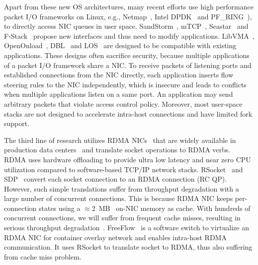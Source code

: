 Apart from these new OS architectures, many recent efforts use high performance packet I/O frameworks on Linux, e.g., Netmap~\cite{rizzo2012netmap}, Intel DPDK~\cite{dpdk} and PF\_RING~\cite{pf-ring}), to directly access NIC queues in user space.
SandStorm~\cite{marinos2014network}, mTCP~\cite{jeong2014mtcp}, Seastar~\cite{seastar} and F-Stack~\cite{fstack} propose new interfaces and thus need to modify applications. LibVMA~\cite{libvma}, OpenOnload~\cite{openonload}, DBL~\cite{dbl} and LOS~\cite{huang2017high} are designed to be compatible with existing applications.
These designs often sacrifice security, because multiple applications of a packet I/O framework share a NIC. To receive packets of listening ports and established connections from the NIC directly, each application inserts flow steering rules to the NIC independently, which is insecure and leads to conflicts when multiple applications listen on a same port. An application may send arbitrary packets that violate access control policy. Moreover, most user-space stacks are not designed to accelerate intra-host connections and have limited fork support.

 The third line of research utilizes RDMA NICs~\cite{mellanox} that are widely available in production data centers~\cite{guo2016rdma} and translate socket operations to RDMA verbs. RDMA uses hardware offloading to provide ultra low latency and near zero CPU utilization compared to software-based TCP/IP network stacks. RSocket~\cite{rsockets} and SDP~\cite{socketsdirect} convert each socket connection to an RDMA connection (RC QP). However, such simple translations suffer from throughput degradation with a large number of concurrent connections. This is because RDMA NIC keeps per-connection states using a $\approx$2~MB~\cite{kalia2018datacenter} on-NIC memory as cache. With hundreds of concurrent connections, we will suffer from frequent cache misses, resulting in serious throughput degradation~\cite{mprdma,kaminsky2016design}. FreeFlow~\cite{freeflow, nsdi19freeflow} is a software switch to virtualize an RDMA NIC for container overlay network and enables intra-host RDMA communication. It uses RSocket to translate socket to RDMA, thus also suffering from cache miss problem. 



